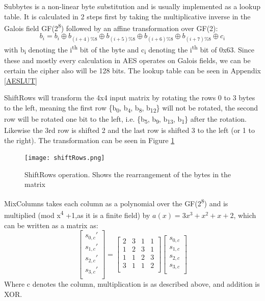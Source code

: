 \documentclass[a4paper, openany]{book}
\begin{document}
Subbytes is a non-linear byte substitution and is usually implemented as a lookup table. It is calculated in 2 steps first by taking the multiplicative inverse in the Galois field GF(2\textsuperscript{8}) followed by an affine transformation over GF(2):
\[b_i = b_i \oplus b_{(i+4) \% 8} \oplus b_{(i+5) \% 8} \oplus b_{(i+6) \% 8} \oplus b_{(i+7) \% 8} \oplus c_i \] with b\textsubscript{i} denoting the i\textsuperscript{th} bit of the byte and c\textsubscript{i} denoting the i\textsuperscript{th} bit of 0x63. Since these and mostly every calculation in AES operates on Galois fields, we can be certain the cipher also will be 128 bits. The lookup table can be seen in Appendix \ref{AESLUT}

ShiftRows will transform the 4x4 input matrix by rotating the rows 0 to 3 bytes to the left, meaning the first row \{b\textsubscript{0}, b\textsubscript{4}, b\textsubscript{8}, b\textsubscript{12}\} will not be rotated, the second row will be rotated one bit to the left, i.e. \{b\textsubscript{5}, b\textsubscript{9}, b\textsubscript{13}, b\textsubscript{1}\} after the rotation. Likewise the 3rd row is shifted 2 and the last row is shifted 3 to the left (or 1 to the right). The transformation can be seen in Figure \ref{fig:ShiftRows}


\begin{figure}[!htb]
\centering
\texttt{[image: shiftRows.png]}
\caption[ShiftRows operation]{ShiftRows operation. Shows the rearrangement of the bytes in the matrix}
\label{fig:ShiftRows}
\end{figure}

MixColumns takes each column as a polynomial over the GF(2\textsuperscript{8}) and is multiplied (mod x\textsuperscript{4} +1,as it is a finite field) by \(a(x) = 3x^3 + x^2 + x + 2\), which can be written as a matrix as:
\[
\begin{bmatrix}
 s_{0,c}' \\
 s_{1,c}' \\
 s_{2,c}' \\
 s_{3,c}' \\
\end{bmatrix}=
\begin{bmatrix}
 2 & 3 & 1 & 1 \\
 1 & 2 & 3 & 1 \\
 1 & 1 & 2 & 3 \\
 3 & 1 & 1 & 2 \\
\end{bmatrix}
\begin{bmatrix}
 s_{0,c} \\
 s_{1,c} \\
 s_{2,c} \\
 s_{3,c} \\
\end{bmatrix}
\]
Where c denotes the column, multiplication is as described above, and addition is XOR.
\end{document}
